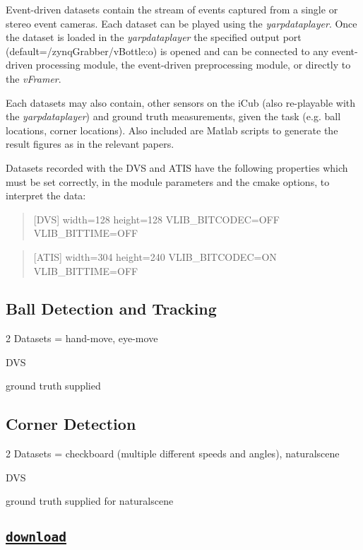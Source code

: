 Event-\/driven datasets contain the stream of events captured from a single or stereo event cameras. Each dataset can be played using the {\itshape yarpdataplayer}. Once the dataset is loaded in the {\itshape yarpdataplayer} the specified output port (default=/zynq\+Grabber/v\+Bottle\+:o) is opened and can be connected to any event-\/driven processing module, the event-\/driven preprocessing module, or directly to the {\itshape v\+Framer}.

Each datasets may also contain, other sensors on the i\+Cub (also re-\/playable with the {\itshape yarpdataplayer}) and ground truth measurements, given the task (e.\+g. ball locations, corner locations). Also included are Matlab scripts to generate the result figures as in the relevant papers.

Datasets recorded with the D\+VS and A\+T\+IS have the following properties which must be set correctly, in the module parameters and the cmake options, to interpret the data\+: \begin{quote}
\mbox{[}D\+VS\mbox{]} width=128 height=128 V\+L\+I\+B\+\_\+B\+I\+T\+C\+O\+D\+EC=O\+FF V\+L\+I\+B\+\_\+B\+I\+T\+T\+I\+ME=O\+FF \end{quote}


\begin{quote}
\mbox{[}A\+T\+IS\mbox{]} width=304 height=240 V\+L\+I\+B\+\_\+B\+I\+T\+C\+O\+D\+EC=ON V\+L\+I\+B\+\_\+B\+I\+T\+T\+I\+ME=O\+FF \end{quote}


\subsection*{Ball Detection and Tracking}


\begin{DoxyItemize}
\item 2 Datasets = hand-\/move, eye-\/move
\item D\+VS
\item ground truth supplied
\end{DoxyItemize}

\subsection*{Corner Detection}


\begin{DoxyItemize}
\item 2 Datasets = checkboard (multiple different speeds and angles), naturalscene
\item D\+VS
\item ground truth supplied for naturalscene
\end{DoxyItemize}

\subsection*{\href{https://figshare.com/s/0abd8f18312bec15b121}{\tt download}}